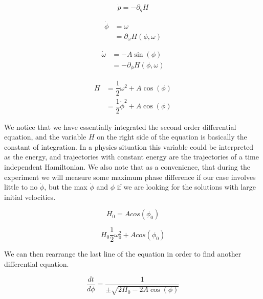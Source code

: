 \documentclass[12pt]{article}
\begin{document}
\begin{equation}
\dot{p} = -\partial_{q} H
\end{equation}

\begin{equation}
\begin{split}
\dot{\phi}& = \omega \\
& = \partial_{\omega} H(\phi, \omega)
\end{split}
\end{equation}

\begin{equation}
\begin{split}
\dot{\omega}& = - A \sin(\phi) \\
& = -\partial_{\phi} H(\phi, \omega)
\end{split}
\end{equation}

\begin{equation}
\begin{split}
H & =\dfrac{1}{2} \omega^2 +  A \cos(\phi) \\
& = \dfrac{1}{2} \dot{\phi}^2 +  A \cos(\phi)
\end{split}
\end{equation}

We notice that we have essentially integrated the second order differential equation, and the variable $H$ on the right side of the equation is basically the constant of integration.  In a physics situation this variable could be interpreted as the energy, and trajectories with constant energy are the trajectories of a time independent Hamiltonian.  We also note that as a convenience, that during the experiment we will measure some maximum phase difference if our case involves little to no $\dot{\phi}$, but the max $\dot{\phi}$ and $\phi$ if we are looking for the solutions with large initial velocities.

\begin{equation}
H_0 = A cos(\phi_{0})
\end{equation}

\begin{equation}
H_0 \dfrac{1}{2}\omega_0^2 + Acos(\phi_0)
\end{equation}

We can then rearrange the last line of the equation in order to find another differential equation.

\begin{equation}
\dfrac{dt}{d\phi} = \dfrac{1}{\pm \sqrt{2H_0 -  2A \cos(\phi)}}
\end{equation}
\end{document}
